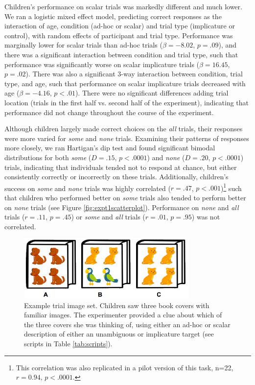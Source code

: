 \documentclass[10pt,letterpaper]{article}
\begin{document}
Children's performance on scalar trials was markedly different and much lower. We ran a logistic mixed effect model, predicting correct responses as the interaction of age, condition (ad-hoc or scalar) and trial type (implicature or control), with random effects of participant and trial type. Performance was marginally lower for scalar trials than ad-hoc trials ($\beta = -8.02$, $p =.09$), and there was a significant interaction between condition and trial type, such that performance was significantly worse on scalar implicature trials ($\beta = 16.45$, $p = .02$).  There was also a significant 3-way interaction between condition, trial type, and age, such that performance on scalar implicature trials decreased with age ($\beta = -4.16$, $p < .01$). There were no significant differences adding trial location (trials in the first half vs. second half of the experiment), indicating that performance did not change throughout the course of the experiment.

Although children largely made correct choices on the \emph{all} trials, their responses were more varied for \emph{some} and \emph{none} trials.  Examining their patterns of responses more closely, we ran Hartigan's dip test and found significant bimodal distributions for both \emph{some} ($D=.15$, $p<.0001$) and \emph{none} ($D=.20$, $p<.0001$) trials, indicating that individuals tended not to respond at chance, but either consistently correctly or incorrectly on these trials. Additionally, children's success on \emph{some} and \emph{none} trials was highly correlated ($r=.47$, $p<.001$)\footnote{This correlation was also replicated in a pilot version of this task, n=22, $r=0.94$, $p<.0001$.} such that children who performed better on \emph{some} trials also tended to perform better on \emph{none} trials (see Figure \ref{fig:expt1scatterplot}). Performance on \emph{none} and \emph{all} trials ($r=.11$, $p=.45$) or \emph{some} and \emph{all} trials ($r=.01$, $p=.95$) was not correlated.

 \begin{figure}[h] 
  \begin{center} 
    \includegraphics[width=3.5in]{figures/implicatures_demo_letters.png} 
    \caption{\label{fig:demo} Example trial image set. Children saw three book covers with familiar images. The experimenter provided a clue about which of the three covers she was thinking of, using either an ad-hoc or scalar description of either an unambiguous or implicature target (see scripts in Table \ref{tab:scripts}).}
    \end{center} 
\end{figure}
\end{document}
